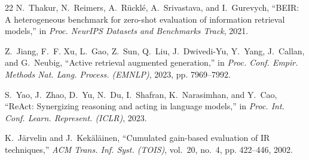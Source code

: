 \documentclass[conference]{IEEEtran}
\begin{document}
\begin{thebibliography}{22}
N.~Thakur, N.~Reimers, A.~Rücklé, A.~Srivastava, and I.~Gurevych,
``BEIR: A heterogeneous benchmark for zero-shot evaluation of information retrieval models,''
in \emph{Proc. NeurIPS Datasets and Benchmarks Track}, 2021.

Z.~Jiang, F.~F. Xu, L.~Gao, Z.~Sun, Q.~Liu, J.~Dwivedi-Yu, Y.~Yang, J.~Callan, and G.~Neubig,
``Active retrieval augmented generation,''
in \emph{Proc. Conf. Empir. Methods Nat. Lang. Process. (EMNLP)}, 2023, pp. 7969--7992.

S.~Yao, J.~Zhao, D.~Yu, N.~Du, I.~Shafran, K.~Narasimhan, and Y.~Cao,
``ReAct: Synergizing reasoning and acting in language models,''
in \emph{Proc. Int. Conf. Learn. Represent. (ICLR)}, 2023.

K.~Järvelin and J.~Kekäläinen,
``Cumulated gain-based evaluation of IR techniques,''
\emph{ACM Trans. Inf. Syst. (TOIS)}, vol.~20, no.~4, pp. 422--446, 2002.

\end{thebibliography}
\end{document}
